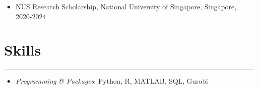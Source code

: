 \documentclass[12pt, a4paper]{article}
\begin{document}
{\begin{itemize}[leftmargin=36pt, itemsep=1pt, parsep=0.5pt, topsep=1pt]
	\item NUS Research Scholarship, National University of Singapore, Singapore, 2020-2024
	



\end{itemize}




\section*{Skills}
\vspace*{0.4em}
\hrule height 0.5pt
\begin{itemize}[leftmargin=36pt, itemsep=2pt, parsep=0.2pt, topsep=1pt]

	\item {\it Programming \& Packages}: Python, R, MATLAB, SQL, Gurobi

\end{itemize}
}



\end{document}
